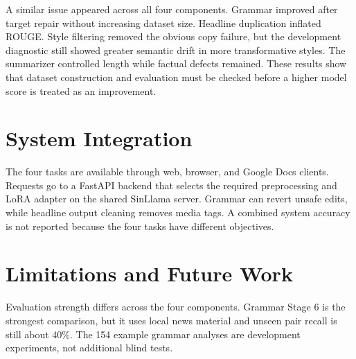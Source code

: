 \documentclass[a4paper,conference]{IEEEtran}
\begin{document}
A similar issue appeared across all four components. Grammar improved after
target repair without increasing dataset size. Headline duplication inflated
ROUGE. Style filtering removed the obvious copy failure, but the development
diagnostic still showed greater semantic drift in more transformative styles.
The summarizer controlled length while factual defects remained. These results
show that dataset construction and evaluation must be checked before a higher
model score is treated as an improvement.

\section{System Integration}
The four tasks are available through web, browser, and Google Docs clients.
Requests go to a FastAPI backend that selects the required preprocessing and
LoRA adapter on the shared SinLlama server. Grammar can revert unsafe edits,
while headline output cleaning removes media tags. A combined system accuracy
is not reported because the four tasks have different objectives.

\section{Limitations and Future Work}
\label{sec:limitations}
Evaluation strength differs across the four components. Grammar Stage 6 is the
strongest comparison, but it uses local news material and unseen pair recall is
still about 40\%. The 154 example grammar analyses are development experiments,
not additional blind tests.
\end{document}
